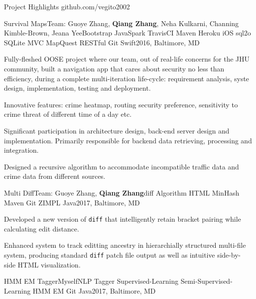 \documentclass{resume} %
\begin{document}
\begin{rSection}{Project Highlights \faGithub\hspace{0.1cm} github.com/vegito2002}

\begin{rSubsection}{Survival Maps}{Team: Guoye Zhang, {\bf Qiang Zhang}, Neha Kulkarni, Channing Kimble-Brown, Jeana Yee}{Bootstrap JavaSpark TravisCI Maven Heroku iOS sql2o SQLite MVC MapQuest RESTful Git Swift}{2016, Baltimore, MD}
\item Fully-fleshed OOSE project where our team, out of real-life concerns for the JHU community, built a navigation app that cares about security no less than efficiency, during a complete multi-iteration life-cycle: requirement analysis, syste design, implementation, testing and deployment.
\item Innovative features: crime heatmap, routing security preference, sensitivity to crime threat of different time of a day etc.
\item Significant participation in architecture design, back-end server design and implementation. Primarily responsible for backend data retrieving, processing and integration.
\item Designed a recursive algorithm to accommodate incompatible traffic data and crime data from different sources.
\end{rSubsection}
\begin{rSubsection}{Multi Diff}{Team: Guoye Zhang, {\bf Qiang Zhang}}{diff Algorithm HTML MinHash Maven Git ZIMPL Java}{2017, Baltimore, MD}
\item Developed a new version of \texttt{diff} that intelligently retain bracket pairing while calculating edit distance.
\item Enhanced system to track editting ancestry in hierarchially structured multi-file system, producing standard \texttt{diff} patch file output as well as intuitive side-by-side HTML visualization.
\end{rSubsection}
\begin{rSubsection}{HMM EM Tagger}{Myself}{NLP Tagger Supervised-Learning Semi-Supervised-Learning HMM EM Git Java}{2017, Baltimore, MD}

\end{rSubsection}
\end{rSection}
\end{document}
